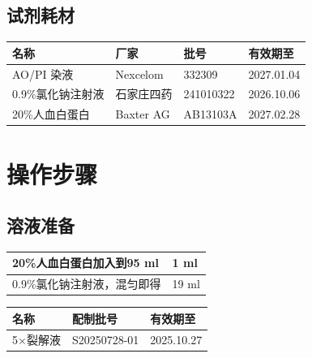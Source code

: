 \documentclass[UTF8,10pt,a4paper,fontset=fandol]{ctexart}
\newcommand{\fieldvalue}[1]{#1}
\newcommand{\handwritten}[1]{#1}
\begin{document}
\subsection{试剂耗材}

\begin{tabularx}{\textwidth}{|X|X|X|X|}
\hline
名称 & 厂家 & 批号 & 有效期至 \\ \hline
AO/PI 染液 & Nexcelom &
\fieldvalue{\handwritten{332309}} &
\fieldvalue{\handwritten{2027.01.04}} \\
\hline
0.9\%氯化钠注射液 & 石家庄四药 &
\fieldvalue{\handwritten{241010322}} &
\fieldvalue{\handwritten{2026.10.06}} \\
\hline
20\%人血白蛋白 & Baxter AG &
\fieldvalue{\handwritten{AB13103A}} &
\fieldvalue{\handwritten{2027.02.28}} \\
\hline
\end{tabularx}

\section{操作步骤}

\subsection*{溶液准备}

\begin{tabularx}{\textwidth}{|X|X|}
\hline
20\%人血白蛋白加入到95 ml &
\fieldvalue{\handwritten{1}} ml \\ \hline
0.9\%氯化钠注射液，混匀即得 &
\fieldvalue{\handwritten{19}} ml \\ \hline
\end{tabularx}

\begin{tabularx}{\textwidth}{|X|X|X|}
\hline
名称 & 配制批号 & 有效期至 \\ \hline
5$\times$裂解液 &
\fieldvalue{\handwritten{S20250728-01}} &
\fieldvalue{\handwritten{2025.10.27}} \\
\hline
\end{tabularx}
\end{document}
